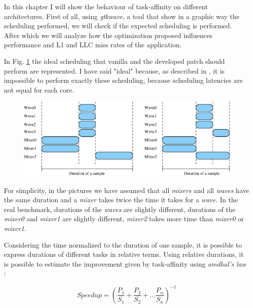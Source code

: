 In this chapter I will show the behaviour of task-affinity on different architectures. First of all, using \textit{gtkwave}, a tool that show in a 
graphic way the scheduling performed, we will check if the expected scheduling is performed. After which we will analyze how the optimization proposed 
influences performance and L1 and LLC miss rates of the application. 

In Fig. \ref{fig:ideal_scheduling} the ideal scheduling that vanilla and the developed patch should perform are represented.
I have said "ideal" because, as described in \cite{lcs}, it is impossible to perform exactly these scheduling, because scheduling latencies are not equal 
for each core.

\begin{figure}[htbp]
\centering
\includegraphics[width=\widefigure]{images/schedule_van_taskaff.eps}
\caption{}
\label{fig:ideal_scheduling}
\end{figure}

For simplicity, in the pictures we have assumed that all \textit{mixers} and all \textit{waves} have the same duration and a \textit{mixer} takes twice the 
time it takes for a \textit{wave}. In the real benchmark, durations of the \textit{waves} are slightly different, durations of the \textit{mixer0} and 
\textit{mixer1} are slightly different, \textit{mixer2} takes more time than \textit{mixer0} or \textit{mixer1}.

Considering the time normalized to the duration of one sample, it is possible to express durations of different tasks in relative terms.
Using relative durations, it is possible to estimate the improvement given by task-affinity using \textit{amdhal's law} \cite{lcs}:

\begin{equation}
       Speedup = \left(\frac{P_{1}}{S_{1}} + \frac{P_{2}}{S_{2}} + ... \frac{P_{n}}{S_{n}} \right)^{-1} 
\label{eq:amdhal}
\end{equation}


